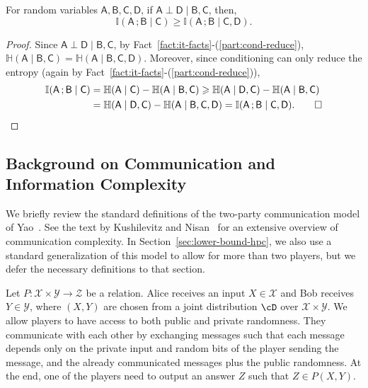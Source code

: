 \documentclass[11pt,letterpaper]{article}
\renewcommand{\paragraph}[1]{\medskip\noindent{\bf #1}\xspace}
\renewcommand{\geq}{\geqslant}
\theoremstyle{definition}
\newcommand{\rA}{\rv{A}}
\newcommand{\rB}{\rv{B}}
\newcommand{\rC}{\rv{C}}
\newcommand{\rD}{\rv{D}}
\newcommand{\rv}[1]{\ensuremath{\mathsf{#1}}}
\newcommand{\II}{\ensuremath{\mathbb{I}}}
\newcommand{\HH}{\ensuremath{\mathbb{H}}}
\newcommand{\mi}[2]{\ensuremath{\II(#1 \,; #2)}}
\newcommand{\itfacts}[1]{Fact~\ref{fact:it-facts}-(\ref{part:#1})\xspace}
\begin{document}
\begin{proposition}\label{prop:info-decrease}
  For random variables $\rA, \rB, \rC,\rD$, if $ \rA \perp \rD \mid \rB,\rC$, then, 
  \[\mi{\rA}{\rB \mid \rC} \geq \mi{\rA}{\rB \mid \rC, \rD}.\]
\end{proposition}
 \begin{proof}
 Since $\rA \perp \rD \mid \rB,\rC$, by \itfacts{cond-reduce}, $\HH(\rA \mid \rB,\rC) = \HH(\rA \mid \rB,\rC,\rD)$. Moreover, since conditioning can only reduce the entropy (again by \itfacts{cond-reduce}), 
  \begin{align*}
 	\mi{\rA}{\rB \mid  \rC} &= \HH(\rA \mid \rC) - \HH(\rA \mid \rB,\rC) \geq \HH(\rA \mid \rD,\rC) - \HH(\rA \mid \rB,\rC) \\
	&= \HH(\rA \mid \rD,\rC) - \HH(\rA \mid \rB,\rC,\rD) = \mi{\rA}{\rB \mid \rC,\rD}. \qed
 \end{align*}

\end{proof}


\subsection{Background on Communication and Information Complexity}\label{sec:cc-ic}

\paragraph{Communication complexity.} We briefly review the standard definitions of the two-party communication model of Yao~\cite{Yao79}.  See the text by Kushilevitz and Nisan~\cite{KushilevitzN97} for 
an extensive overview of communication complexity. In Section~\ref{sec:lower-bound-hpc}, we also use a standard generalization of this model to allow for more than two players, but we defer
the necessary definitions to that section. 

Let $P: \mathcal{X} \times \mathcal{Y} \rightarrow \mathcal{Z}$ be a relation.  Alice receives an input $X
\in \mathcal{X}$ and Bob receives $Y \in \mathcal{Y}$, where $(X,Y)$ are chosen from a
joint distribution $\cD$ over $\mathcal{X} \times \mathcal{Y}$. We allow players to have access to both public and private randomness. 
They communicate with each other by exchanging messages such that each message
depends only on the private input and random bits of the player sending the message, and the already communicated messages plus the public randomness. 
At the end, one of the players need to output an answer  $Z$ such that $Z \in P(X,Y)$.  
\end{document}
